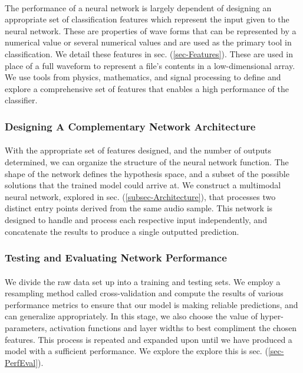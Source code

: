 \documentclass[12pt,letterpaper]{article}
\begin{document}
\paragraph*{}The performance of a neural network is largely dependent of designing an appropriate set of classification features which represent the input given to the neural network. These are properties of wave forms that can be represented by a numerical value or several numerical values and are used as the primary tool in classification. We detail these features in sec. (\ref{sec-Features}). These are used in place of a full waveform to represent a file's contents in a low-dimensional array. We use tools from physics, mathematics, and signal processing to define and explore a comprehensive set of features that enables a high performance of the classifier. 


\subsubsection{Designing A Complementary Network Architecture}

\paragraph*{}With the appropriate set of features designed, and the number of outputs determined, we can organize the structure of the neural network function. The shape of the network defines the hypothesis space, and a subset of the possible solutions that the trained model could arrive at. We construct a multimodal neural network, explored in sec. (\ref{subsec-Architecture}), that processes two distinct entry points derived from the same audio sample. This network is designed to handle and process each respective input independently, and concatenate the results to produce a single outputted prediction.


\subsubsection{Testing and Evaluating Network Performance}

\paragraph*{}We divide the raw data set up into a training and testing sets. We employ a resampling method called cross-validation and compute the results of various performance metrics to ensure that our model is making reliable predictions, and can generalize appropriately. In this stage, we also choose the value of hyper-parameters, activation functions and layer widths to best compliment the chosen features. This process is repeated and expanded upon until we have produced a model with a sufficient performance. We explore the explore this is sec. (\ref{sec-PerfEval}).
\end{document}
